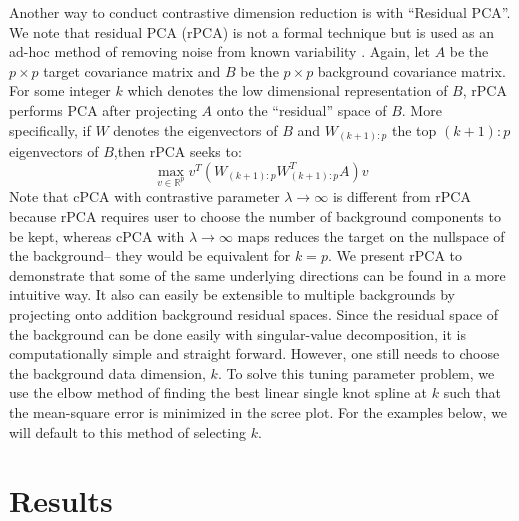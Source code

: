 \documentclass[12pt]{article}
\begin{document}
Another way to conduct contrastive dimension reduction is with ``Residual PCA''. We note that residual PCA (rPCA) is not a formal technique but is used as an ad-hoc method of removing noise from known variability  \cite{rpca}. Again, let $A$ be the $p \times p$ target covariance matrix and $B$ be the $p\times p$ background covariance matrix.  For some integer $k$ which denotes the low dimensional representation of $B$, rPCA performs PCA after projecting $A$ onto the ``residual'' space of $B$. More specifically, if $W$ denotes the eigenvectors of $B$ and $W_{(k+1):p}$ the top $(k+1):p$ eigenvectors of $B$,then rPCA seeks to:
\[\max_{v\in \mathbb{R}^p}{v^T \left(W_{(k+1):p}W_{(k+1):p}^T A\right) v}\]
Note that cPCA with contrastive parameter $\lambda \rightarrow \infty$ is different from rPCA because rPCA requires user to choose the number of background components to be kept, whereas cPCA with $\lambda \rightarrow \infty$ maps reduces the target on the nullspace of the background-- they would be equivalent for $k = p$. We present rPCA to demonstrate that some of the same underlying directions can be found in a more intuitive way. It also can easily be extensible to multiple backgrounds by projecting onto addition background residual spaces. Since the residual space of the background can be done easily with singular-value decomposition, it is computationally simple and straight forward. However, one still needs to choose the background data dimension, $k$.
To solve this tuning parameter problem, we use the elbow method of finding the best linear single knot spline at $k$ such that the mean-square error is minimized in the scree plot. For the examples below, we will default to this method of selecting $k$. %
   

\section{Results}
\end{document}
